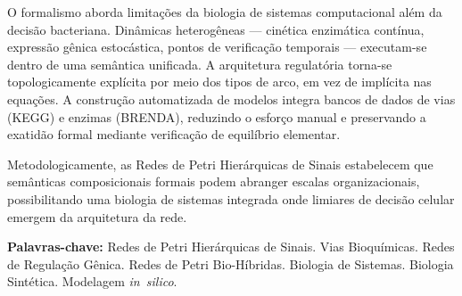 O formalismo aborda limitações da biologia de sistemas computacional além da
decisão bacteriana. Dinâmicas heterogêneas --- cinética enzimática contínua,
expressão gênica estocástica, pontos de verificação temporais --- executam-se
dentro de uma semântica unificada. A arquitetura regulatória torna-se
topologicamente explícita por meio dos tipos de arco, em vez de implícita nas
equações. A construção automatizada de modelos integra bancos de dados de vias
(KEGG) e enzimas (BRENDA), reduzindo o esforço manual e preservando a exatidão
formal mediante verificação de equilíbrio elementar.

Metodologicamente, as Redes de Petri Hierárquicas de Sinais estabelecem que
semânticas composicionais formais podem abranger escalas organizacionais,
possibilitando uma biologia de sistemas integrada onde limiares de
decisão celular emergem da arquitetura da rede.

\vspace{1cm}
\noindent\textbf{Palavras-chave:} Redes de Petri Hierárquicas de Sinais.
Vias Bioquímicas. Redes de Regulação Gênica. Redes de Petri Bio-Híbridas.
Biologia de Sistemas. Biologia Sintética. Modelagem \textit{in~silico}.

\cleardoublepage

